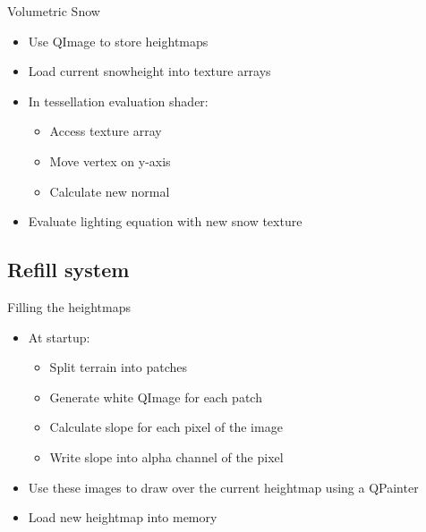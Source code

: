 \documentclass[18pt]{beamer}
\begin{document}
\begin{frame}{Volumetric Snow}
\begin{itemize}
\item Use QImage to store heightmaps
\item Load current snowheight into texture arrays
\item In tessellation evaluation shader:
\begin{itemize}
	\item Access texture array
	\item Move vertex on y-axis
	\item Calculate new normal
\end{itemize}
\item Evaluate lighting equation with new snow texture
\end{itemize}
\end{frame}

\subsection{Refill system}
\begin{frame}{Filling the heightmaps}
\begin{itemize}
\item At startup:
\begin{itemize}
	\item Split terrain into patches
	\item Generate white QImage for each patch
	\item Calculate slope for each pixel of the image
	\item Write slope into alpha channel of the pixel
\end{itemize}
\item Use these images to draw over the current heightmap using a QPainter
\item Load new heightmap into memory
\end{itemize}
\end{frame}
\end{document}
